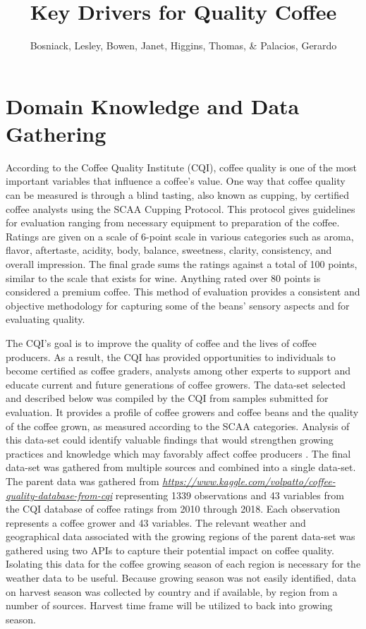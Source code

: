 \documentclass[
  12pt,
  english,
  man]{apa6}
\author{Bosniack, Lesley, Bowen, Janet, Higgins, Thomas, \& Palacios, Gerardo}
\affiliation{
\vspace{0.5cm}
\textsuperscript{1} DSC 424 - Advanced Data Analysis\\\textsuperscript{2} DePaul University}
\title{Key Drivers for Quality Coffee}
\date{}
\begin{document}
\maketitle

\singlespacing

\hypertarget{domain-knowledge-and-data-gathering}{%
\section{Domain Knowledge and Data Gathering}\label{domain-knowledge-and-data-gathering}}

According to the Coffee Quality Institute (CQI), coffee quality is one of the most important variables that influence a coffee's value. One way that coffee quality can be measured is through a blind tasting, also known as cupping, by certified coffee analysts using the SCAA Cupping Protocol. This protocol gives guidelines for evaluation ranging from necessary equipment to preparation of the coffee. Ratings are given on a scale of 6-point scale in various categories such as aroma, flavor, aftertaste, acidity, body, balance, sweetness, clarity, consistency, and overall impression. The final grade sums the ratings against a total of 100 points, similar to the scale that exists for wine. Anything rated over 80 points is considered a premium coffee. This method of evaluation provides a consistent and objective methodology for capturing some of the beans' sensory aspects and for evaluating quality.
~

The CQI's goal is to improve the quality of coffee and the lives of coffee producers. As a result, the CQI has provided opportunities to individuals to become certified as coffee graders, analysts among other experts to support and educate current and future generations of coffee growers. The data-set selected and described below was compiled by the CQI from samples submitted for evaluation. It provides a profile of coffee growers and coffee beans and the quality of the coffee grown, as measured according to the SCAA categories. Analysis of this data-set could identify valuable findings that would strengthen growing practices and knowledge which may favorably affect coffee producers
. The final data-set was gathered from multiple sources and combined into a single data-set. The parent data was gathered from \emph{\url{https://www.kaggle.com/volpatto/coffee-quality-database-from-cqi}} representing 1339 observations and 43 variables from the CQI database of coffee ratings from 2010 through 2018. Each observation represents a coffee grower and 43 variables. The relevant weather and geographical data associated with the growing regions of the parent data-set was gathered using two APIs to capture their potential impact on coffee quality. Isolating this data for the coffee growing season of each region is necessary for the weather data to be useful. Because growing season was not easily identified, data on harvest season was collected by country and if available, by region from a number of sources. Harvest time frame will be utilized to back into growing season.
\end{document}
